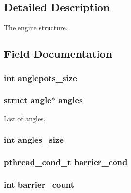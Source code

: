 \subsection{Detailed Description}
The \hyperlink{structengine}{engine} structure. 

\subsection{Field Documentation}
\hypertarget{structengine_a08e34a86b30f21972c7d2229b38ff042}{
\subsubsection[{anglepots\-\_\-size}]{\setlength{\rightskip}{0pt plus 5cm}int anglepots\-\_\-size}}\label{structengine_a08e34a86b30f21972c7d2229b38ff042}
\hypertarget{structengine_ab28bf1df3e6849a71e5d02f6ddfab24e}{
\subsubsection[{angles}]{\setlength{\rightskip}{0pt plus 5cm}struct {\bf angle}$\ast$ angles}}\label{structengine_ab28bf1df3e6849a71e5d02f6ddfab24e}
List of angles. \hypertarget{structengine_aa888783007ffcf01a85b0e529b081c11}{
\subsubsection[{angles\-\_\-size}]{\setlength{\rightskip}{0pt plus 5cm}int angles\-\_\-size}}\label{structengine_aa888783007ffcf01a85b0e529b081c11}
\hypertarget{structengine_a07802036197963e79daf5ec2071c6e20}{
\subsubsection[{barrier\-\_\-cond}]{\setlength{\rightskip}{0pt plus 5cm}pthread\-\_\-cond\-\_\-t barrier\-\_\-cond}}\label{structengine_a07802036197963e79daf5ec2071c6e20}
\hypertarget{structengine_ae42edcb32fe06022c2a46a343055d7e6}{
\subsubsection[{barrier\-\_\-count}]{\setlength{\rightskip}{0pt plus 5cm}int barrier\-\_\-count}}\label{structengine_ae42edcb32fe06022c2a46a343055d7e6}
